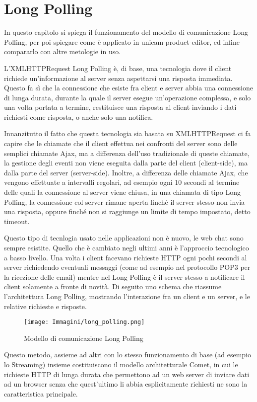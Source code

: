 \chapter{Long Polling}
\label{chap:long_polling}
In questo capitolo si spiega il funzionamento del modello di comunicazione Long Polling, per poi spiegare come è applicato in unicam-product-editor, ed infine compararlo con altre metologie in uso.

L'XMLHTTPRequest Long Polling è, di base, una tecnologia dove il client richiede un'informazione al server senza aspettarsi una risposta immediata.
Questo fa sì che la connessione che esiste fra client e server abbia una connessione di lunga durata, durante la quale il server esegue un'operazione complessa, e solo una volta portata a termine, restituisce una risposta al client inviando i dati richiesti come risposta, o anche solo una notifica.

Innanzitutto il fatto che questa tecnologia sia basata su XMLHTTPRequest ci fa capire che le chiamate che il client effettua nei confronti del server sono delle semplici chiamate Ajax, ma a differenza dell'uso tradizionale di queste chiamate, la gestione degli eventi non viene eseguita dalla parte del client (client-side), ma dalla parte del server (server-side).
Inoltre, a differenza delle chiamate Ajax, che vengono effettuate a intervalli regolari, ad esempio ogni 10 secondi al termine delle quali la connessione al server viene chiusa, in una chiamata di tipo Long Polling, la connessione col server rimane aperta finché il server stesso non invia una risposta, oppure finché non si raggiunge un limite di tempo impostato, detto timeout.

Questo tipo di tecnlogia usato nelle applicazioni non è nuovo, le web chat sono sempre esistite. Quello che è cambiato negli ultimi anni è l’approccio tecnologico a basso livello. Una volta i client facevano richieste HTTP ogni pochi secondi al server richiedendo eventuali messaggi (come ad esempio nel protocollo POP3 per la ricezione delle email) mentre nel Long Polling è il server stesso a notificare il client solamente a fronte di novità.
\newpage
Di seguito uno schema che riassume l'architettura Long Polling, mostrando l'interazione fra un client e un server, e le relative richieste e risposte.
\begin{figure}[h]
	\centering
	\texttt{[image: Immagini/long\_polling.png]}
	\caption{Modello di comunicazione Long Polling}
\end{figure}

Questo metodo, assieme ad altri con lo stesso funzionamento di base (ad esempio lo Streaming) insieme costituiscono il modello architetturale Comet, in cui le richieste HTTP di lunga durata che permettono ad un web server di inviare dati ad un browser senza che quest'ultimo li abbia esplicitamente richiesti ne sono la caratteristica principale.

